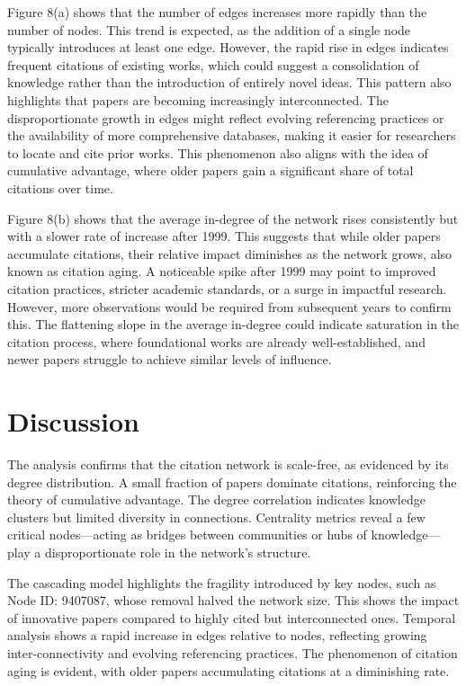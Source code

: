 \documentclass{article}
\begin{document}
Figure 8(a) shows that the number of edges increases more rapidly than the number of nodes. This trend is expected, as the addition of a single node typically introduces at least one edge. However, the rapid rise in edges indicates frequent citations of existing works, which could suggest a consolidation of knowledge rather than the introduction of entirely novel ideas. This pattern also highlights that papers are becoming increasingly interconnected. The disproportionate growth in edges might reflect evolving referencing practices or the availability of more comprehensive databases, making it easier for researchers to locate and cite prior works. This phenomenon also aligns with the idea of cumulative advantage, where older papers gain a significant share of total citations over time.

Figure 8(b) shows that the average in-degree of the network rises consistently but with a slower rate of increase after 1999. This suggests that while older papers accumulate citations, their relative impact diminishes as the network grows, also known as citation aging. A noticeable spike after 1999 may point to improved citation practices, stricter academic standards, or a surge in impactful research. However, more observations would be required from subsequent years to confirm this. The flattening slope in the average in-degree could indicate saturation in the citation process, where foundational works are already well-established, and newer papers struggle to achieve similar levels of influence.

\section{Discussion}
\label{headings}
The analysis confirms that the citation network is scale-free, as evidenced by its degree distribution. A small fraction of papers dominate citations, reinforcing the theory of cumulative advantage. The degree correlation indicates knowledge clusters but limited diversity in connections. Centrality metrics reveal a few critical nodes—acting as bridges between communities or hubs of knowledge—play a disproportionate role in the network’s structure.

The cascading model highlights the fragility introduced by key nodes, such as Node ID: 9407087, whose removal halved the network size. This shows the impact of innovative papers compared to highly cited but interconnected ones. Temporal analysis shows a rapid increase in edges relative to nodes, reflecting growing inter-connectivity and evolving referencing practices. The phenomenon of citation aging is evident, with older papers accumulating citations at a diminishing rate.
\end{document}
